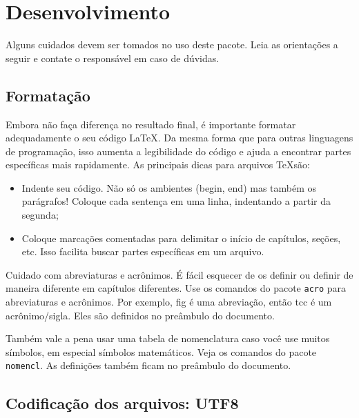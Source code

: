 \chapter{Desenvolvimento}\label{desenvolvimento}

Alguns cuidados devem ser tomados no uso deste pacote.
  Leia as orientações a seguir e contate o responsável em caso de dúvidas.
  

\section{Formatação}

Embora não faça diferença no resultado final, é importante formatar adequadamente o seu código \LaTeX.
  Da mesma forma que para outras linguagens de programação, isso aumenta a legibilidade do código e ajuda a encontrar partes específicas mais rapidamente.
  As principais dicas para arquivos \TeX são:
 \begin{itemize}
   \item Indente seu código. Não só os ambientes (begin, end) mas também os parágrafos! Coloque cada sentença em uma linha, indentando a partir da segunda;
   \item Coloque marcações comentadas para delimitar o início de capítulos, seções, etc. Isso facilita buscar partes específicas em um arquivo.
 \end{itemize}
    
Cuidado com abreviaturas e acrônimos.
  É fácil esquecer de os definir ou definir de maneira diferente em capítulos diferentes.
  Use os comandos do pacote \texttt{acro} para abreviaturas e acrônimos.
  Por exemplo, \ac{fig} é uma abreviação, então \ac{tcc} é um acrônimo/sigla.
  Eles são definidos no preâmbulo do documento.
  
Também vale a pena usar uma tabela de nomenclatura caso você use muitos símbolos, em especial símbolos matemáticos.
  Veja os comandos do pacote \texttt{nomencl}.
  As definições também ficam no preâmbulo do documento.


\section{Codificação dos arquivos: UTF8}

